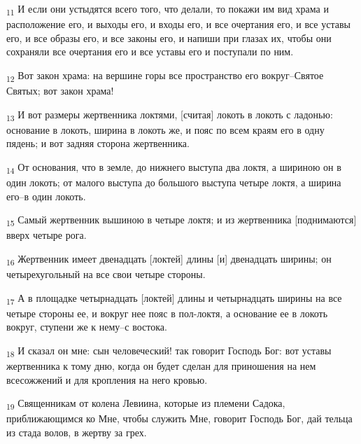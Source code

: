 \begin{tcolorbox}
\textsubscript{11} И если они устыдятся всего того, что делали, то покажи им вид храма и расположение его, и выходы его, и входы его, и все очертания его, и все уставы его, и все образы его, и все законы его, и напиши при глазах их, чтобы они сохраняли все очертания его и все уставы его и поступали по ним.
\end{tcolorbox}
\begin{tcolorbox}
\textsubscript{12} Вот закон храма: на вершине горы все пространство его вокруг--Святое Святых; вот закон храма!
\end{tcolorbox}
\begin{tcolorbox}
\textsubscript{13} И вот размеры жертвенника локтями, [считая] локоть в локоть с ладонью: основание в локоть, ширина в локоть же, и пояс по всем краям его в одну пядень; и вот задняя сторона жертвенника.
\end{tcolorbox}
\begin{tcolorbox}
\textsubscript{14} От основания, что в земле, до нижнего выступа два локтя, а шириною он в один локоть; от малого выступа до большого выступа четыре локтя, а ширина его--в один локоть.
\end{tcolorbox}
\begin{tcolorbox}
\textsubscript{15} Самый жертвенник вышиною в четыре локтя; и из жертвенника [поднимаются] вверх четыре рога.
\end{tcolorbox}
\begin{tcolorbox}
\textsubscript{16} Жертвенник имеет двенадцать [локтей] длины [и] двенадцать ширины; он четырехугольный на все свои четыре стороны.
\end{tcolorbox}
\begin{tcolorbox}
\textsubscript{17} А в площадке четырнадцать [локтей] длины и четырнадцать ширины на все четыре стороны ее, и вокруг нее пояс в пол-локтя, а основание ее в локоть вокруг, ступени же к нему--с востока.
\end{tcolorbox}
\begin{tcolorbox}
\textsubscript{18} И сказал он мне: сын человеческий! так говорит Господь Бог: вот уставы жертвенника к тому дню, когда он будет сделан для приношения на нем всесожжений и для кропления на него кровью.
\end{tcolorbox}
\begin{tcolorbox}
\textsubscript{19} Священникам от колена Левиина, которые из племени Садока, приближающимся ко Мне, чтобы служить Мне, говорит Господь Бог, дай тельца из стада волов, в жертву за грех.
\end{tcolorbox}
